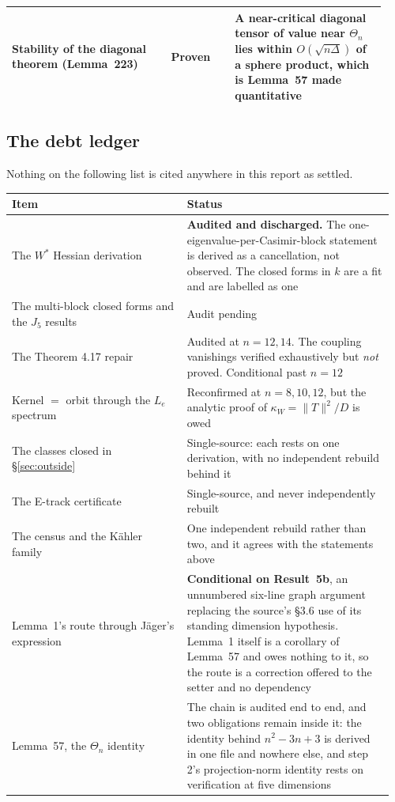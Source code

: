 \begin{longtable}{@{}p{0.40\linewidth}p{0.16\linewidth}p{0.38\linewidth}@{}}
Stability of the diagonal theorem (Lemma~223) & \textbf{Proven} & A near-critical diagonal tensor of value near $\Theta_n$ lies within $O(\sqrt{n\Delta})$ of a sphere product, which is Lemma~57 made quantitative \\
\bottomrule
\end{longtable}

\subsection{The debt ledger}\label{sec:debt}

Nothing on the following list is cited anywhere in this report as settled.

\begin{longtable}{@{}p{0.44\linewidth}p{0.52\linewidth}@{}}
\toprule
\textbf{Item} & \textbf{Status} \\
\midrule
\endhead
The $W^{*}$ Hessian derivation & \textbf{Audited and discharged.} The one-eigenvalue-per-Casimir-block statement is derived as a cancellation, not observed. The closed forms in $k$ are a fit and are labelled as one \\
The multi-block closed forms and the $J_5$ results & Audit pending \\
The Theorem 4.17 repair & Audited at $n=12,14$. The coupling vanishings verified exhaustively but \emph{not} proved. Conditional past $n=12$ \\
Kernel $=$ orbit through the $L_e$ spectrum & Reconfirmed at $n=8,10,12$, but the analytic proof of $\kappa_W=\|T\|^2/D$ is owed \\
The classes closed in \S\ref{sec:outside} & Single-source: each rests on one derivation, with no independent rebuild behind it \\
The E-track certificate & Single-source, and never independently rebuilt \\
The census and the K\"ahler family & One independent rebuild rather than two, and it agrees with the statements above \\
Lemma~1's route through J\"ager's expression & \textbf{Conditional on Result~5b}, an unnumbered six-line graph argument replacing the source's \S3.6 use of its standing dimension hypothesis. Lemma~1 itself is a corollary of Lemma~57 and owes nothing to it, so the route is a correction offered to the setter and no dependency \\
Lemma~57, the $\Theta_n$ identity & The chain is audited end to end, and two obligations remain inside it: the identity behind $n^2-3n+3$ is derived in one file and nowhere else, and step 2's projection-norm identity rests on verification at five dimensions \\

\end{longtable}
